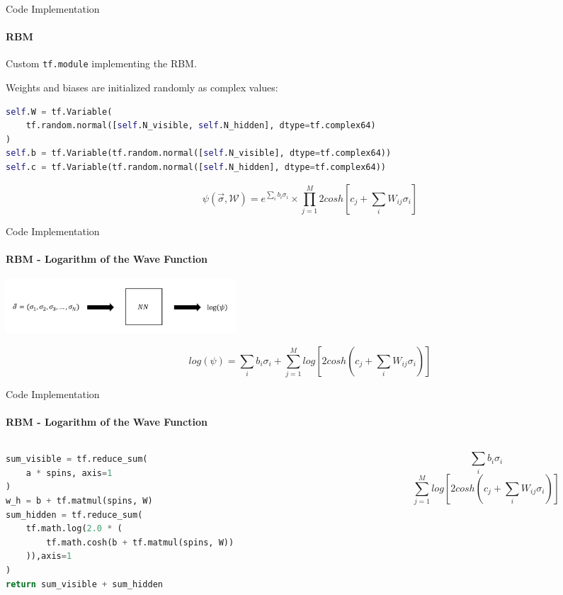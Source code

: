 \documentclass{beamer}
\begin{document}
\begin{frame}[fragile]{Code Implementation}
\framesubtitle{RBM}

Custom \lstinline[style=kaolstplain]|tf.module| implementing the RBM.
\baselineskip

Weights and biases are initialized randomly as complex values:
\begin{lstlisting}[language=Python, style=kaolstplain]
self.W = tf.Variable(
	tf.random.normal([self.N_visible, self.N_hidden], dtype=tf.complex64)
)
self.b = tf.Variable(tf.random.normal([self.N_visible], dtype=tf.complex64))
self.c = tf.Variable(tf.random.normal([self.N_hidden], dtype=tf.complex64))
\end{lstlisting}

$$\psi\left(\vec{\sigma}, \mathcal{W}\right) = e^{\sum_{i} b_i \sigma_i} \times \prod_{j=1}^{M} {2 cosh\left[c_j + \sum_{i} W_{ij} \sigma_i\right]}$$

\end{frame}

\begin{frame}[fragile]{Code Implementation}
\framesubtitle{RBM - Logarithm of the Wave Function}

\begin{center}
    \includegraphics[height=2cm]{images/rbm_usage.png}
\end{center}

$$log\left(\psi\right) = \sum_{i} b_i \sigma_i + \sum_{j=1}^{M} log\left[{2 cosh\left(c_j + \sum_{i} W_{ij} \sigma_i\right)} \right]$$

\end{frame}

\begin{frame}[fragile]{Code Implementation}
\framesubtitle{RBM - Logarithm of the Wave Function}
\begin{columns}
\begin{column}{0.6\textwidth}
\begin{lstlisting}[language=Python, style=kaolstplain]
sum_visible = tf.reduce_sum(
	a * spins, axis=1
)
w_h = b + tf.matmul(spins, W)
sum_hidden = tf.reduce_sum(
	tf.math.log(2.0 * (
		tf.math.cosh(b + tf.matmul(spins, W))
	)),axis=1
)
return sum_visible + sum_hidden
\end{lstlisting}
\end{column}
\begin{column}{0.38\textwidth}
$$\sum_{i} b_i \sigma_i$$
$$\sum_{j=1}^{M} log\left[{2 cosh\left(c_j + \sum_{i} W_{ij} \sigma_i\right)} \right]$$
\end{column}
\end{columns}

\end{frame}
\end{document}
